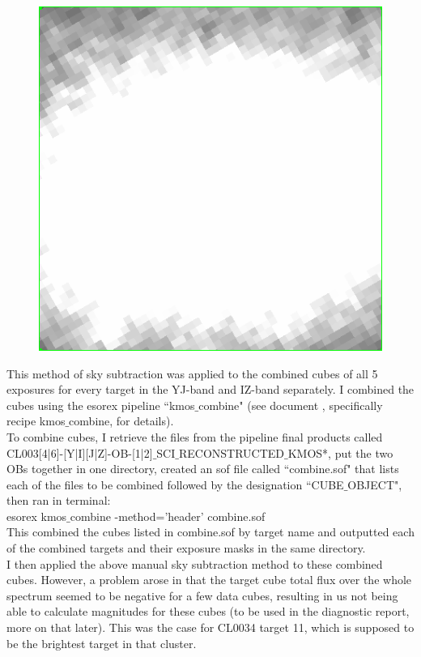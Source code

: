 \documentclass[10pt,letterpaper]{article}
\begin{document}
\begin{figure}[h!]
\includegraphics[scale=0.4]{figures/CL0036-Target_26.png}
\end{figure}

This method of sky subtraction was applied to the combined cubes of all 5 exposures for every target in the YJ-band and IZ-band separately. I combined the cubes using the esorex pipeline ``kmos$\_$combine" (see document \cite{KMOS pipeline manual}, specifically recipe kmos$\_$combine, for details).\\

To combine cubes, I retrieve the files from the pipeline final products called\\ CL003[4|6]-[Y|I][J|Z]-OB-[1|2]$\_$SCI$\_$RECONSTRUCTED$\_$KMOS*, put the two OBs together in one directory, created an sof file called ``combine.sof" that lists each of the files to be combined followed by the designation ``CUBE$\_$OBJECT", then ran in terminal:\\

esorex kmos$\_$combine -method='header' combine.sof\\

This combined the cubes listed in combine.sof by target name and outputted each of the combined targets and their exposure masks in the same directory.\\

I then applied the above manual sky subtraction method to these combined cubes. However, a problem arose in that the target cube total flux over the whole spectrum seemed to be negative for a few data cubes, resulting in us not being able to calculate magnitudes for these cubes (to be used in the diagnostic report, more on that later). This was the case for CL0034 target 11, which is supposed to be the brightest target in that cluster.
\end{document}
